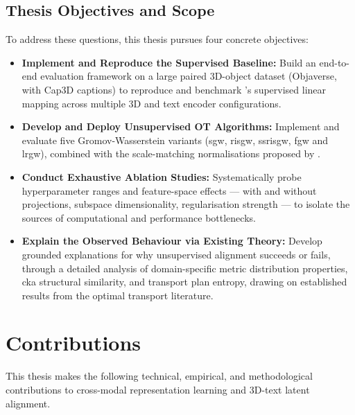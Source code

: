\subsection{Thesis Objectives and Scope}

\label{subsec:thesis_scope}

To address these questions, this thesis pursues four concrete objectives:

\begin{itemize}

\item \textbf{Implement and Reproduce the Supervised Baseline:} Build an end-to-end evaluation framework on a large paired 3D-object dataset (Objaverse, with Cap3D captions) to reproduce and benchmark \textcite{hadgi2025escaping}'s supervised linear mapping across multiple 3D and text encoder configurations.

\item \textbf{Develop and Deploy Unsupervised OT Algorithms:} Implement and evaluate five Gromov-Wasserstein variants (\gls{sgw}, \gls{risgw}, \gls{ssrisgw}, \gls{fgw} and \gls{lrgw}), combined with the scale-matching normalisations proposed by \textcite{li2026scale}.

\item \textbf{Conduct Exhaustive Ablation Studies:} Systematically probe hyperparameter ranges and feature-space effects --- with and without projections, subspace dimensionality, regularisation strength --- to isolate the sources of computational and performance bottlenecks.

\item \textbf{Explain the Observed Behaviour via Existing Theory:} Develop grounded explanations for why unsupervised alignment succeeds or fails, through a detailed analysis of domain-specific metric distribution properties, \gls{cka} structural similarity, and transport plan entropy, drawing on established results from the optimal transport literature.

\end{itemize}

\section{Contributions}
\label{sec:contributions}

This thesis makes the following technical, empirical, and methodological contributions to cross-modal representation learning and 3D-text latent alignment.

